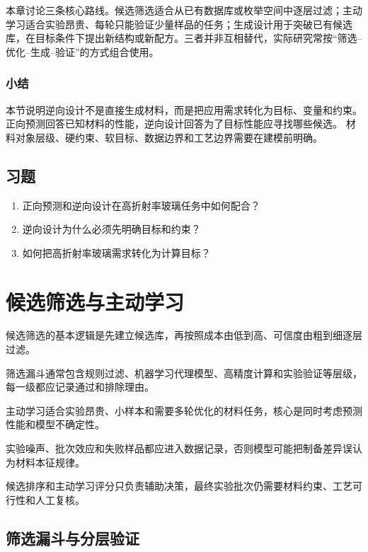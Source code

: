 本章讨论三条核心路线。候选筛选适合从已有数据库或枚举空间中逐层过滤；主动学习适合实验昂贵、每轮只能验证少量样品的任务；生成设计用于突破已有候选库，在目标条件下提出新结构或新配方。三者并非互相替代，实际研究常按“筛选--优化--生成--验证”的方式组合使用。

\subsubsection*{\textbf{小结}}

本节说明逆向设计不是直接生成材料，而是把应用需求转化为目标、变量和约束。
正向预测回答已知材料的性能，逆向设计回答为了目标性能应寻找哪些候选。
材料对象层级、硬约束、软目标、数据边界和工艺边界需要在建模前明确。

\subsection*{习题}

\begin{enumerate}[leftmargin=*]
\item 正向预测和逆向设计在高折射率玻璃任务中如何配合？
\item 逆向设计为什么必须先明确目标和约束？
\item 如何把高折射率玻璃需求转化为计算目标？
\end{enumerate}

\clearpage
\section{候选筛选与主动学习}


\begin{sectionkeypoints}
\item 候选筛选的基本逻辑是先建立候选库，再按照成本由低到高、可信度由粗到细逐层过滤。
\item 筛选漏斗通常包含规则过滤、机器学习代理模型、高精度计算和实验验证等层级，每一级都应记录通过和排除理由。
\item 主动学习适合实验昂贵、小样本和需要多轮优化的材料任务，核心是同时考虑预测性能和模型不确定性。
\item 实验噪声、批次效应和失败样品都应进入数据记录，否则模型可能把制备差异误认为材料本征规律。
\item 候选排序和主动学习评分只负责辅助决策，最终实验批次仍需要材料约束、工艺可行性和人工复核。
\end{sectionkeypoints}

\subsection{筛选漏斗与分层验证}

